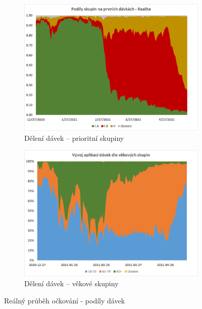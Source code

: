 \begin{figure}
\centering

\begin{subfigure}{0.9\textwidth}
\includegraphics[width=\textwidth]{assets/theta_real}
\caption{Dělení dávek -- prioritní skupiny}
\label{gr_real_theta}
\end{subfigure}

\begin{subfigure}{0.9\textwidth}
\includegraphics[width=\textwidth]{assets/chart_vek}
\caption{Dělení dávek -- věkové skupiny}
\label{gr_skupiny_davky_vek}
\end{subfigure}


\caption{Reálný průběh očkování - podíly dávek}
\end{figure}

